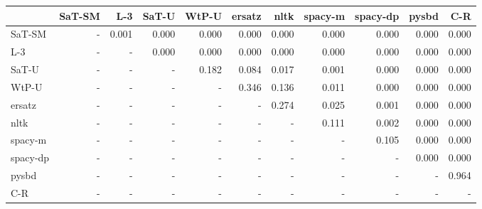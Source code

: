 \begin{tabular}{lrrrrrrrrrr}
\toprule
 & SaT-SM & L-3 & SaT-U & WtP-U & ersatz & nltk & spacy-m & spacy-dp & pysbd & C-R \\
\midrule
SaT-SM & - & 0.001 & 0.000 & 0.000 & 0.000 & 0.000 & 0.000 & 0.000 & 0.000 & 0.000 \\
L-3 & - & - & 0.000 & 0.000 & 0.000 & 0.000 & 0.000 & 0.000 & 0.000 & 0.000 \\
SaT-U & - & - & - & 0.182 & 0.084 & 0.017 & 0.001 & 0.000 & 0.000 & 0.000 \\
WtP-U & - & - & - & - & 0.346 & 0.136 & 0.011 & 0.000 & 0.000 & 0.000 \\
ersatz & - & - & - & - & - & 0.274 & 0.025 & 0.001 & 0.000 & 0.000 \\
nltk & - & - & - & - & - & - & 0.111 & 0.002 & 0.000 & 0.000 \\
spacy-m & - & - & - & - & - & - & - & 0.105 & 0.000 & 0.000 \\
spacy-dp & - & - & - & - & - & - & - & - & 0.000 & 0.000 \\
pysbd & - & - & - & - & - & - & - & - & - & 0.964 \\
C-R & - & - & - & - & - & - & - & - & - & - \\
\bottomrule
\end{tabular}

